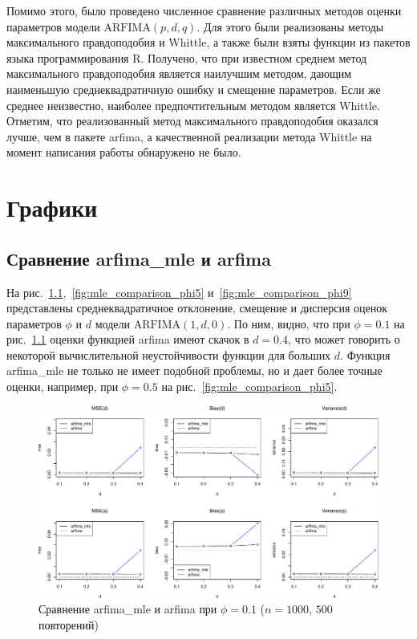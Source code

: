 \documentclass[specialist,
substylefile = spbu_report.rtx,
subf,href,colorlinks=true, 12pt]{disser}
\theoremstyle{definition}
\begin{document}
Помимо этого, было проведено численное сравнение различных методов оценки параметров модели $\mathrm{ARFIMA}(p, d, q)$. Для этого были реализованы методы максимального правдоподобия и Whittle, а также были взяты функции из пакетов языка программирования \textsf{R}. Получено, что при известном среднем метод максимального правдоподобия является наилучшим методом, дающим наименьшую среднеквадратичную ошибку и смещение параметров. Если же среднее неизвестно, наиболее предпочтительным методом является Whittle. Отметим, что реализованный метод максимального правдоподобия оказался лучше, чем в пакете \textsf{arfima}, а качественной реализации метода Whittle на момент написания работы обнаружено не было.




\appendix
\chapter{Графики}
\section{Сравнение \textsf{arfima\_mle} и \textsf{arfima}}\label{sect:mle_comparison}
На рис.~\ref{fig:mle_comparison_phi1},~\ref{fig:mle_comparison_phi5} и~\ref{fig:mle_comparison_phi9} представлены среднеквадратичное отклонение, смещение и дисперсия оценок параметров $\phi$ и $d$ модели $\mathrm{ARFIMA}(1, d, 0)$. По ним, видно, что при $\phi=0.1$ на рис.~\ref{fig:mle_comparison_phi1} оценки функцией \textsf{arfima} имеют скачок в $d=0.4$, что может говорить о некоторой вычислительной неустойчивости функции для больших $d$. Функция \textsf{arfima\_mle} не только не имеет подобной проблемы, но и дает более точные оценки, например, при $\phi=0.5$ на рис.~\ref{fig:mle_comparison_phi5}.

\begin{figure}[h]
	\centering
	\includegraphics[width=\textwidth]{img/arfi_est_phi1.pdf}
	\caption{Сравнение \textsf{arfima\_mle} и \textsf{arfima} при $\phi=0.1$ ($n=1000$, $500$ повторений)}
	\label{fig:mle_comparison_phi1}
\end{figure}
\end{document}
